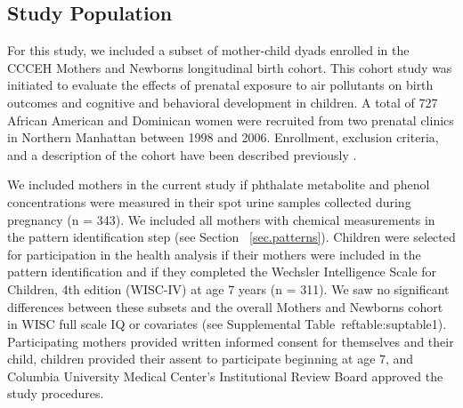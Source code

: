 \subsection{Study Population}
For this study, we included a subset of mother-child dyads enrolled in the CCCEH Mothers and Newborns longitudinal birth cohort. This cohort study was initiated to evaluate the effects of prenatal exposure to air pollutants on birth outcomes and cognitive and behavioral development in children. A total of 727 African American and Dominican women were recruited from two prenatal clinics in Northern Manhattan between 1998 and 2006. Enrollment, exclusion criteria, and a description of the cohort have been described previously \citep{perera03}.

We included mothers in the current study if phthalate metabolite and phenol concentrations were measured in their spot urine samples collected during pregnancy (n = 343). We included all mothers with chemical measurements in the pattern identification step (see Section ~\ref{sec.patterns}). Children were selected for participation in the health analysis if their mothers were included in the pattern identification and if they completed the Wechsler Intelligence Scale for Children, 4th edition (WISC-IV) at age 7 years (n = 311). We saw no significant differences between these subsets and the overall Mothers and Newborns cohort in WISC full scale IQ or covariates (see Supplemental Table~ref{table:suptable1}). Participating mothers provided written informed consent for themselves and their child, children provided their assent to participate beginning at age 7, and Columbia University Medical Center's Institutional Review Board approved the study procedures.

